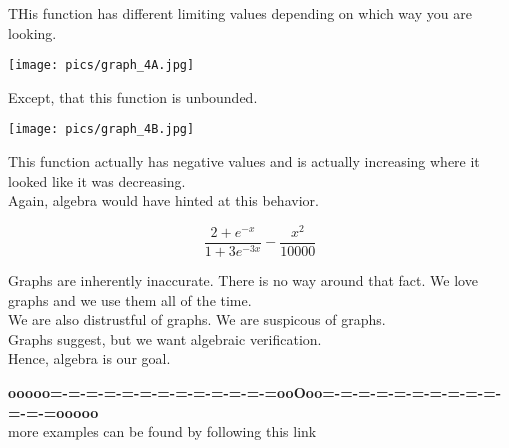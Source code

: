 \documentclass{ximera}
\begin{document}
\begin{example}


THis function has different limiting values depending on which way you are looking.

\begin{image}
\texttt{[image: pics/graph\_4A.jpg]}
\end{image}




Except, that this function is unbounded.

\begin{image}
\texttt{[image: pics/graph\_4B.jpg]}
\end{image}


This function actually has negative values and is actually increasing where it looked like it was decreasing. \\


Again, algebra would have hinted at this behavior.

\[  \frac{2+e^{-x}}{1+3 e^{-3x}} -\frac{x^2}{10000}     \]


\end{example}



Graphs are inherently inaccurate.  There is no way around that fact.  We love graphs and we use them all of the time. \\

We are also distrustful of graphs.  We are suspicous of graphs. \\

Graphs suggest, but we want algebraic verification. \\

Hence, algebra is our goal.












\begin{center}
\textbf{\textcolor{green!50!black}{ooooo=-=-=-=-=-=-=-=-=-=-=-=-=ooOoo=-=-=-=-=-=-=-=-=-=-=-=-=ooooo}} \\

more examples can be found by following this link\\ 

\end{center}
\end{document}
